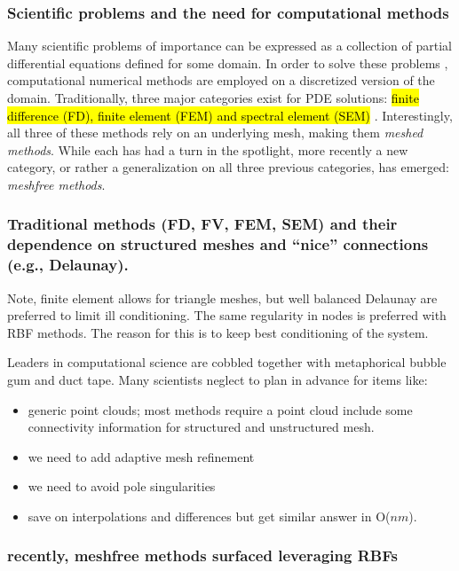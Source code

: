 \documentclass[11pt]{report}
\begin{document}
\subsubsection{Scientific problems and the need for computational methods} 

Many scientific problems of importance can be expressed as a collection of partial differential equations defined for some domain. In order to solve these 
problems , computational numerical methods are employed on a discretized version of the domain. Traditionally, three major categories exist for PDE solutions: \hl{ finite difference (FD), finite element (FEM) and spectral element (SEM)} \cite{Fasshauer:2007}. Interestingly, all three of these methods rely on an underlying mesh, making them \emph{meshed methods}. While each has had a turn in the spotlight, more recently a new category, or rather a generalization on all three previous categories, has emerged: \emph{meshfree methods}. 

\subsubsection{Traditional methods (FD, FV, FEM, SEM) and their dependence on structured meshes and ``nice'' connections (e.g., Delaunay).}
Note, finite element allows for triangle meshes, but well balanced Delaunay are preferred to limit ill conditioning. The same regularity in nodes is preferred with RBF methods. The reason for this is to keep best conditioning of the system. 

Leaders in computational science are cobbled together with metaphorical bubble gum and duct tape. Many scientists neglect to plan in advance for items like: 
\begin{itemize}
\item generic point clouds; most methods require a point cloud include some connectivity information for structured and unstructured mesh. 
\item we need to add adaptive mesh refinement
\item we need to avoid pole singularities
\item save on interpolations and differences but get similar answer in O($nm$). 
\end{itemize} 

\subsubsection{ recently, meshfree methods surfaced leveraging RBFs}
\end{document}
